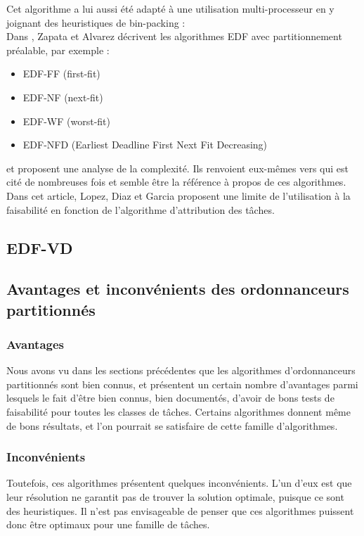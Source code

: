 \documentclass[11pt,a4paper,oneside]{report}
\begin{document}
Cet algorithme a lui aussi été adapté à une utilisation multi-processeur en y joignant 
des heuristiques de bin-packing : \\
Dans \cite{pereira_zapata_edf_2005}, Zapata et Alvarez décrivent les algorithmes 
EDF avec partitionnement préalable, par exemple : \\
\begin{itemize}
	\item EDF-FF (first-fit)
	\item EDF-NF (next-fit)
	\item EDF-WF (worst-fit)
	\item EDF-NFD (Earliest Deadline First Next Fit Decreasing)
\end{itemize}
et proposent une analyse de la complexité. Ils renvoient eux-mêmes vers 
\cite{lopez_utilization_2004} 
qui est cité de nombreuses fois et semble être la référence à propos de ces algorithmes. 
Dans cet article, Lopez, Diaz et Garcia proposent une limite de l'utilisation à la 
faisabilité en fonction de l'algorithme d'attribution des tâches. 

\subsection{EDF-VD}


\subsection{Avantages et inconvénients des ordonnanceurs partitionnés}
\subsubsection{Avantages}
Nous avons vu dans les sections précédentes que les algorithmes d'ordonnanceurs 
partitionnés sont bien connus, et présentent un certain nombre d'avantages parmi lesquels 
le fait d'être bien connus, bien documentés, d'avoir de bons tests de faisabilité pour 
toutes les classes de tâches. 
Certains algorithmes donnent même de bons résultats, et l'on pourrait se satisfaire de 
cette famille d'algorithmes.\\

\subsubsection{Inconvénients}
Toutefois, ces algorithmes présentent quelques inconvénients. 
L'un d'eux est que leur résolution ne garantit pas de trouver la solution optimale, 
puisque ce sont des heuristiques. Il n'est pas envisageable de penser 
que ces algorithmes puissent donc être optimaux pour une famille de tâches.
\end{document}
